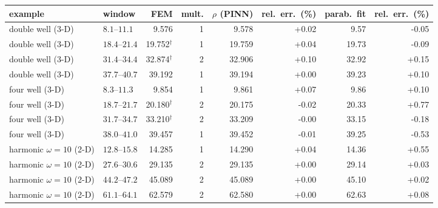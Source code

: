 \begin{tabular}{llrrrrrr}
\toprule
example & window & FEM & mult. & $\rho$ (PINN) & rel.\ err.\ (\%) & parab.\ fit & rel.\ err.\ (\%) \\
\midrule
double well (3-D) & $8.1$--$11.1$ & 9.576 & 1 & 9.578 & +0.02 & 9.57 & -0.05 \\
double well (3-D) & $18.4$--$21.4$ & 19.752$^\dagger$ & 1 & 19.759 & +0.04 & 19.73 & -0.09 \\
double well (3-D) & $31.4$--$34.4$ & 32.874$^\dagger$ & 2 & 32.906 & +0.10 & 32.92 & +0.15 \\
double well (3-D) & $37.7$--$40.7$ & 39.192 & 1 & 39.194 & +0.00 & 39.23 & +0.10 \\
\midrule
four well (3-D) & $8.3$--$11.3$ & 9.854 & 1 & 9.861 & +0.07 & 9.86 & +0.10 \\
four well (3-D) & $18.7$--$21.7$ & 20.180$^\dagger$ & 2 & 20.175 & -0.02 & 20.33 & +0.77 \\
four well (3-D) & $31.7$--$34.7$ & 33.210$^\dagger$ & 2 & 33.209 & -0.00 & 33.15 & -0.18 \\
four well (3-D) & $38.0$--$41.0$ & 39.457 & 1 & 39.452 & -0.01 & 39.25 & -0.53 \\
\midrule
harmonic $\omega=10$ (2-D) & $12.8$--$15.8$ & 14.285 & 1 & 14.290 & +0.04 & 14.36 & +0.55 \\
harmonic $\omega=10$ (2-D) & $27.6$--$30.6$ & 29.135 & 2 & 29.135 & +0.00 & 29.14 & +0.03 \\
harmonic $\omega=10$ (2-D) & $44.2$--$47.2$ & 45.089 & 2 & 45.089 & +0.00 & 45.10 & +0.02 \\
harmonic $\omega=10$ (2-D) & $61.1$--$64.1$ & 62.579 & 2 & 62.580 & +0.00 & 62.63 & +0.08 \\
\bottomrule
\end{tabular}
